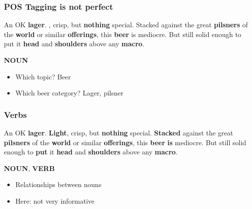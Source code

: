 \begin{frame}
    \frametitle{POS Tagging is not perfect}
\begin{spacing}{1.6}
    An OK \textbf{\textcolor{isered}{lager}}. \textbf{\mybox{\textcolor{isered}{Light}}}, crisp, but \textbf{\textcolor{isered}{nothing}} special. Stacked against the great \textbf{\textcolor{isered}{pilsners}} of the \textbf{\textcolor{isered}{world}} or similar \textbf{\textcolor{isered}{offerings}}, this \textbf{\textcolor{isered}{beer}} is mediocre. But still solid enough to put it \textbf{\textcolor{isered}{head}} and \textbf{\textcolor{isered}{shoulders}} above any \textbf{\textcolor{isered}{macro}}.
\end{spacing}

\vspace{-10pt}
\begin{flushright}
    \textbf{\textcolor{isered}{NOUN}}
\end{flushright}

\vspace{-10pt}
\begin{itemize}
\item Which topic? Beer
\item Which beer category? Lager, pilsner
\end{itemize}

\end{frame}


\begin{frame}
    \frametitle{\textcolor{iseblue}{Verbs}}
    \label{review_verbs}
\begin{spacing}{1.6}
    An OK \textbf{\textcolor{isered}{lager}}. \textbf{\textcolor{isered}{Light}}, crisp, but \textbf{\textcolor{isered}{nothing}} special. \textbf{\textcolor{iseblue}{Stacked}} against the great \textbf{\textcolor{isered}{pilsners}} of the \textbf{\textcolor{isered}{world}} or similar \textbf{\textcolor{isered}{offerings}}, this \textbf{\textcolor{isered}{beer}} \textbf{\textcolor{iseblue}{is}} mediocre. But still solid enough to \textbf{\textcolor{iseblue}{put}} it \textbf{\textcolor{isered}{head}} and \textbf{\textcolor{isered}{shoulders}} above any \textbf{\textcolor{isered}{macro}}.
\end{spacing}

\vspace{-10pt}
\begin{flushright}
    \textbf{\textcolor{isered}{NOUN}}, \textbf{\textcolor{iseblue}{VERB}}
\end{flushright}

\begin{itemize}
\item Relationships between nouns $\; \;$\hyperlink{dependency_tree}{}
\item Here: not very informative
\end{itemize}

\end{frame}

